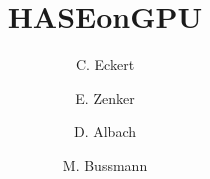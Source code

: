 \documentclass[3p,twocolumn]{elsarticle}
\begin{document}
\title{HASEonGPU}

\author[hzdr]{C. Eckert}

\author[hzdr]{E. Zenker}

\author[hzdr]{D. Albach}

\author[hzdr]{M. Bussmann}

\address[hzdr]{
  Institute of Radiation Physics, 
  Helmholtz-Zentrum Dresden-Rossendorf e. V.,
  Bautzner Landstra\ss e 400,
  01328 Dresden,  
  Germany
}




\maketitle






		




\end{document}

